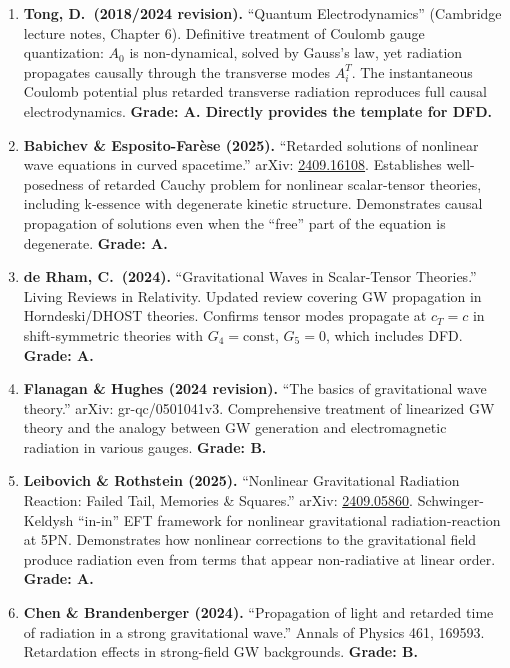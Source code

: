 \documentclass[11pt,a4paper]{article}
\begin{document}
\begin{enumerate}
\item \textbf{Tong, D.\ (2018/2024 revision).} ``Quantum Electrodynamics'' (Cambridge lecture notes, Chapter 6). Definitive treatment of Coulomb gauge quantization: $A_0$ is non-dynamical, solved by Gauss's law, yet radiation propagates causally through the transverse modes $A_i^T$. The instantaneous Coulomb potential plus retarded transverse radiation reproduces full causal electrodynamics. \textbf{Grade: A. Directly provides the template for DFD.}

\item \textbf{Babichev \& Esposito-Far\`{e}se (2025).} ``Retarded solutions of nonlinear wave equations in curved spacetime.'' arXiv: \href{https://arxiv.org/abs/2409.16108}{2409.16108}. Establishes well-posedness of retarded Cauchy problem for nonlinear scalar-tensor theories, including k-essence with degenerate kinetic structure. Demonstrates causal propagation of solutions even when the ``free'' part of the equation is degenerate. \textbf{Grade: A.}

\item \textbf{de Rham, C.\ (2024).} ``Gravitational Waves in Scalar-Tensor Theories.'' Living Reviews in Relativity. Updated review covering GW propagation in Horndeski/DHOST theories. Confirms tensor modes propagate at $c_T = c$ in shift-symmetric theories with $G_4 = \text{const}$, $G_5 = 0$, which includes DFD. \textbf{Grade: A.}

\item \textbf{Flanagan \& Hughes (2024 revision).} ``The basics of gravitational wave theory.'' arXiv: gr-qc/0501041v3. Comprehensive treatment of linearized GW theory and the analogy between GW generation and electromagnetic radiation in various gauges. \textbf{Grade: B.}

\item \textbf{Leibovich \& Rothstein (2025).} ``Nonlinear Gravitational Radiation Reaction: Failed Tail, Memories \& Squares.'' arXiv: \href{https://arxiv.org/abs/2409.05860}{2409.05860}. Schwinger-Keldysh ``in-in'' EFT framework for nonlinear gravitational radiation-reaction at 5PN. Demonstrates how nonlinear corrections to the gravitational field produce radiation even from terms that appear non-radiative at linear order. \textbf{Grade: A.}

\item \textbf{Chen \& Brandenberger (2024).} ``Propagation of light and retarded time of radiation in a strong gravitational wave.'' Annals of Physics 461, 169593. Retardation effects in strong-field GW backgrounds. \textbf{Grade: B.}
\end{enumerate}
\end{document}

